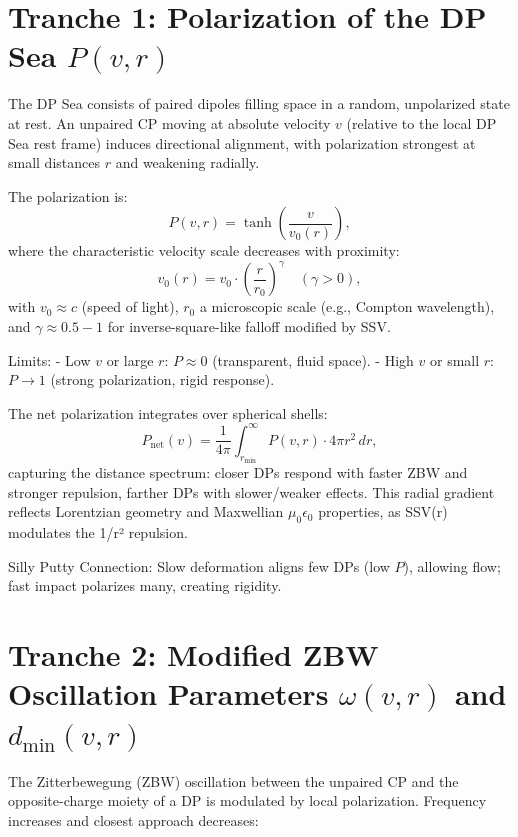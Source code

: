 \documentclass[11pt]{article}
\begin{document}
\section{Tranche 1: Polarization of the DP Sea $P(v, r)$}

The DP Sea consists of paired dipoles filling space in a random, unpolarized state at rest. An unpaired CP moving at absolute velocity $v$ (relative to the local DP Sea rest frame) induces directional alignment, with polarization strongest at small distances $r$ and weakening radially.

The polarization is:
\begin{equation}
P(v, r) = \tanh\left( \frac{v}{v_0(r)} \right),
\end{equation}
where the characteristic velocity scale decreases with proximity:
\begin{equation}
v_0(r) = v_0 \cdot \left( \frac{r}{r_0} \right)^\gamma \quad (\gamma > 0),
\end{equation}
with $v_0 \approx c$ (speed of light), $r_0$ a microscopic scale (e.g., Compton wavelength), and $\gamma \approx 0.5-1$ for inverse-square-like falloff modified by SSV.

Limits:
- Low $v$ or large $r$: $P \approx 0$ (transparent, fluid space).
- High $v$ or small $r$: $P \to 1$ (strong polarization, rigid response).

The net polarization integrates over spherical shells:
\begin{equation}
P_{\text{net}}(v) = \frac{1}{4\pi} \int_{r_{\min}}^\infty P(v, r) \cdot 4\pi r^2 \, dr,
\end{equation}
capturing the distance spectrum: closer DPs respond with faster ZBW and stronger repulsion, farther DPs with slower/weaker effects. This radial gradient reflects Lorentzian geometry and Maxwellian $\mu_0 \epsilon_0$ properties, as SSV(r) modulates the 1/r² repulsion.

Silly Putty Connection: Slow deformation aligns few DPs (low $P$), allowing flow; fast impact polarizes many, creating rigidity.

\section{Tranche 2: Modified ZBW Oscillation Parameters $\omega(v, r)$ and $d_{\min}(v, r)$}

The Zitterbewegung (ZBW) oscillation between the unpaired CP and the opposite-charge moiety of a DP is modulated by local polarization. Frequency increases and closest approach decreases:
\end{document}
